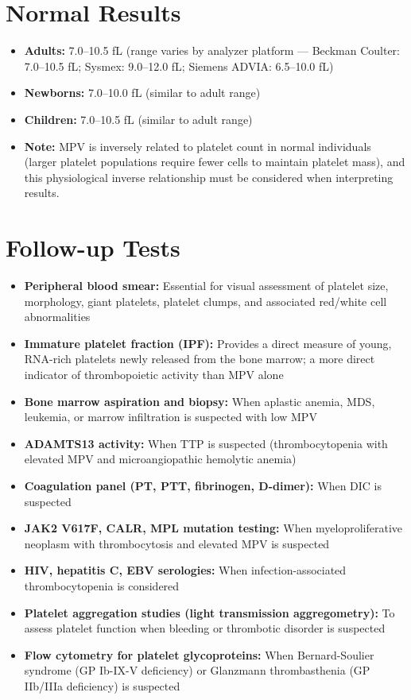 \section*{Normal Results}
\begin{itemize}
  \item \textbf{Adults:} 7.0--10.5 fL (range varies by analyzer platform --- Beckman Coulter: 7.0--10.5 fL; Sysmex: 9.0--12.0 fL; Siemens ADVIA: 6.5--10.0 fL)
  \item \textbf{Newborns:} 7.0--10.0 fL (similar to adult range)
  \item \textbf{Children:} 7.0--10.5 fL (similar to adult range)
  \item \textbf{Note:} MPV is inversely related to platelet count in normal individuals (larger platelet populations require fewer cells to maintain platelet mass), and this physiological inverse relationship must be considered when interpreting results.
\end{itemize}

\section*{Follow-up Tests}
\begin{itemize}
  \item \textbf{Peripheral blood smear:} Essential for visual assessment of platelet size, morphology, giant platelets, platelet clumps, and associated red/white cell abnormalities
  \item \textbf{Immature platelet fraction (IPF):} Provides a direct measure of young, RNA-rich platelets newly released from the bone marrow; a more direct indicator of thrombopoietic activity than MPV alone
  \item \textbf{Bone marrow aspiration and biopsy:} When aplastic anemia, MDS, leukemia, or marrow infiltration is suspected with low MPV
  \item \textbf{ADAMTS13 activity:} When TTP is suspected (thrombocytopenia with elevated MPV and microangiopathic hemolytic anemia)
  \item \textbf{Coagulation panel (PT, PTT, fibrinogen, D-dimer):} When DIC is suspected
  \item \textbf{JAK2 V617F, CALR, MPL mutation testing:} When myeloproliferative neoplasm with thrombocytosis and elevated MPV is suspected
  \item \textbf{HIV, hepatitis C, EBV serologies:} When infection-associated thrombocytopenia is considered
  \item \textbf{Platelet aggregation studies (light transmission aggregometry):} To assess platelet function when bleeding or thrombotic disorder is suspected
  \item \textbf{Flow cytometry for platelet glycoproteins:} When Bernard-Soulier syndrome (GP Ib-IX-V deficiency) or Glanzmann thrombasthenia (GP IIb/IIIa deficiency) is suspected
\end{itemize}

